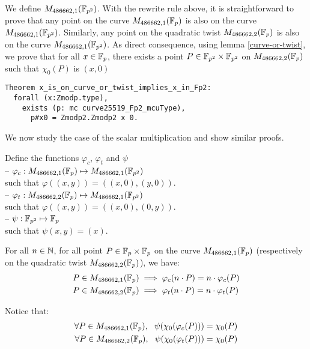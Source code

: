 We define $M_{486662,1}(\mathbb{F}_{p^2})$. With the rewrite rule above, it is straightforward to prove that any point on the curve $M_{486662,1}(\mathbb{F}_{p})$ is also on the curve $M_{486662,1}(\mathbb{F}_{p^2})$. Similarly, any point on the quadratic twist $M_{486662,2}(\mathbb{F}_{p})$ is also on the curve $M_{486662,1}(\mathbb{F}_{p^2})$.
As direct consequence, using lemma \ref{curve-or-twist}, we prove that for all $x \in \mathbb{F}_{p}$, there exists a point $P \in \mathbb{F}_{p^2}\times\mathbb{F}_{p^2}$ on $M_{486662,2}(\mathbb{F}_{p})$ such that $\chi_0(P)$ is $(x,0)$

\begin{lstlisting}[language=Coq]
Theorem x_is_on_curve_or_twist_implies_x_in_Fp2:
  forall (x:Zmodp.type),
    exists (p: mc curve25519_Fp2_mcuType),
      p#x0 = Zmodp2.Zmodp2 x 0.
\end{lstlisting}

We now study the case of the scalar multiplication and show similar proofs.
\begin{dfn}
Define the functions $\varphi_c$, $\varphi_t$ and $\psi$\\
-- $\varphi_c: M_{486662,1}(\mathbb{F}_{p}) \mapsto M_{486662,1}(\mathbb{F}_{p^2})$\\
  such that $\varphi((x,y)) = ((x,0), (y,0))$.\\
-- $\varphi_t: M_{486662,2}(\mathbb{F}_{p}) \mapsto M_{486662,1}(\mathbb{F}_{p^2})$\\
  such that $\varphi((x,y)) = ((x,0), (0,y))$.\\
-- $\psi: \mathbb{F}_{p^2} \mapsto \mathbb{F}_{p}$\\
  such that $\psi(x,y) = (x)$.
\end{dfn}

\begin{lemma}
For all $n \in \mathbb{N}$, for all point $P\in\mathbb{F}_{p}\times\mathbb{F}_{p}$ on the curve $M_{486662,1}(\mathbb{F}_{p})$ (respectively on the quadratic twist $M_{486662,2}(\mathbb{F}_{p})$), we have:
\begin{align*}
P \in M_{486662,1}(\mathbb{F}_{p}) &\implies \varphi_c(n \cdot P) = n \cdot \varphi_c(P)\\
P \in M_{486662,2}(\mathbb{F}_{p}) &\implies \varphi_t(n \cdot P) = n \cdot \varphi_t(P)
\end{align*}
\end{lemma}

Notice that:
\begin{align*}
\forall P \in M_{486662,1}(\mathbb{F}_{p}),\ \ \psi(\chi_0(\varphi_c(P))) = \chi_0(P)\\
\forall P \in M_{486662,2}(\mathbb{F}_{p}),\ \ \psi(\chi_0(\varphi_t(P))) = \chi_0(P)
\end{align*}

